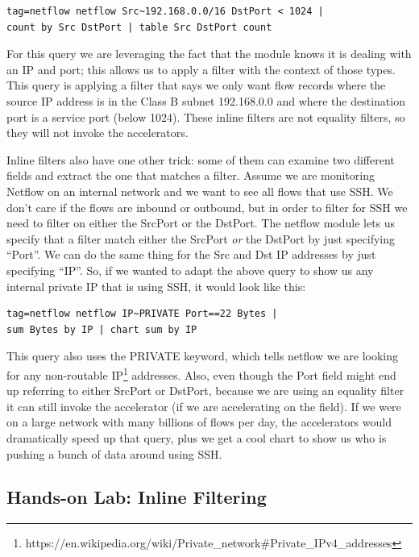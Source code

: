 \begin{Verbatim}[breaklines=true]
tag=netflow netflow Src~192.168.0.0/16 DstPort < 1024 |
count by Src DstPort | table Src DstPort count
\end{Verbatim}

For this query we are leveraging the fact that the  module
knows it is dealing with an IP and port; this allows us to apply a
filter with the context of those types. This query is applying a filter
that says we only want flow records where the source IP address is in
the Class B subnet 192.168.0.0 and where the destination port is a
service port (below 1024). These inline filters are not equality
filters, so they will not invoke the accelerators.

Inline filters also have one other trick: some of them can examine two
different fields and extract the one that matches a filter. Assume we
are monitoring Netflow on an internal network and we want to see all
flows that use SSH. We don't care if the flows are inbound or outbound,
but in order to filter for SSH we need to filter on either the SrcPort
or the DstPort. The netflow module lets us specify that a filter match
either the SrcPort \emph{or} the DstPort by just specifying ``Port''. We can do the
same thing for the Src and Dst IP addresses by just specifying ``IP''. So, if we wanted to adapt
the above query to show us any internal private IP that is using
SSH, it would look like this:

\begin{Verbatim}[breaklines=true]
tag=netflow netflow IP~PRIVATE Port==22 Bytes |
sum Bytes by IP | chart sum by IP
\end{Verbatim}

This query also uses the PRIVATE keyword, which tells netflow we are
looking for any non-routable
IP\footnote{https://en.wikipedia.org/wiki/Private\_network\#Private\_IPv4\_addresses} addresses.
Also, even though the Port field might end up referring to either SrcPort or DstPort, because we are using an equality filter
it can still invoke the accelerator (if we are accelerating on the field).
If we were on a large network with many billions of flows per day, the
accelerators would dramatically speed up that query, plus we get a cool
chart to show us who is pushing a bunch of data around using SSH.

\clearpage
\subsection{Hands-on Lab: Inline Filtering}

